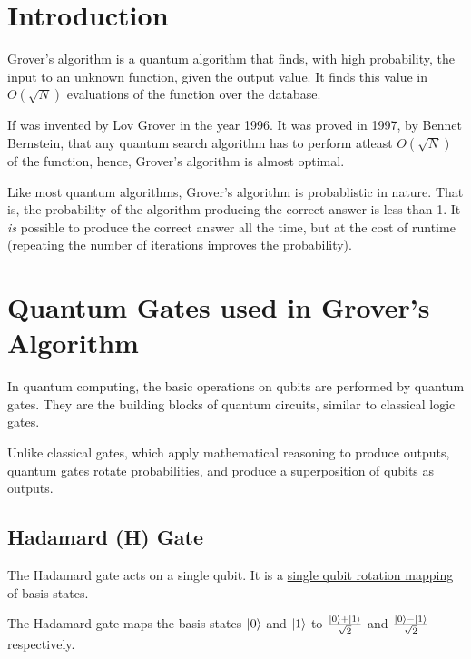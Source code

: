 \documentclass[a4paper]{article}
\begin{document}
\section{Introduction}

Grover's algorithm is a quantum algorithm that finds, with high probability,
the input to an unknown function, given the output value. It finds this value
in $ O(\sqrt{N}) $ evaluations of the function over the database.
\\
\par
If was invented by Lov Grover in the year 1996. It was proved in 1997, by
Bennet Bernstein, that any quantum search algorithm has to perform atleast $
O(\sqrt{N}) $ of the function, hence, Grover's algorithm is almost optimal.
\\
\par
Like most quantum algorithms, Grover's algorithm is probablistic in nature.
That is, the probability of the algorithm producing the correct answer is less
than 1.  It \textit{is} possible to produce the correct answer all the time,
but at the cost of runtime (repeating the number of iterations improves the
probability).

\pagebreak


\section{Quantum Gates used in Grover's Algorithm}

In quantum computing, the basic operations on qubits are performed by quantum gates.
They are the building blocks of quantum circuits, similar to classical logic gates.
\\
\par
Unlike classical gates, which apply mathematical reasoning to produce outputs, 
quantum gates rotate probabilities, and produce a superposition of qubits as outputs.

\subsection{ Hadamard (H) Gate }
The Hadamard gate acts on a single qubit. It is a \underline{single qubit
rotation mapping} of basis states.
\\
\par
The Hadamard gate maps the basis states $\ket{0}$ and $\ket{1}$ to 
$ \frac{\ket{0} + \ket{1}}{\sqrt2}$ and $ \frac{\ket{0} - \ket{1}}{\sqrt2}$ 
respectively.
\end{document}
